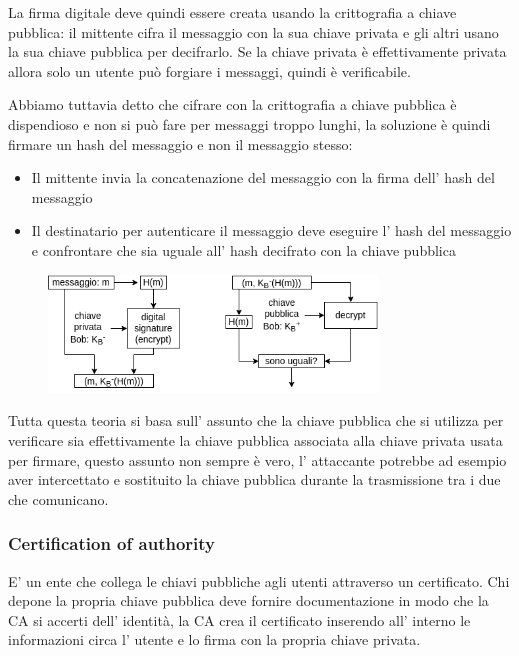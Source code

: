 La firma digitale deve quindi essere creata usando la crittografia a chiave pubblica: il mittente cifra il messaggio con la sua chiave privata e gli altri usano la sua chiave pubblica per decifrarlo.
Se la chiave privata è effettivamente privata allora solo un utente può forgiare i messaggi, quindi è verificabile.

Abbiamo tuttavia detto che cifrare con la crittografia a chiave pubblica è dispendioso e non si può fare per messaggi troppo lunghi, la soluzione è quindi firmare un hash del messaggio e non il messaggio stesso:
\begin{itemize}
    \item Il mittente invia la concatenazione del messaggio con la firma dell' hash del messaggio
    
    \item Il destinatario per autenticare il messaggio deve eseguire l' hash del messaggio e confrontare che sia uguale all' hash decifrato con la chiave pubblica
\end{itemize}

\begin{figure}[H]
    \centering
    \includegraphics[width=330px]{images/7_Security/signed_MAC.png}
\end{figure}

Tutta questa teoria si basa sull' assunto che la chiave pubblica che si utilizza per verificare sia effettivamente la chiave pubblica associata alla chiave privata usata per firmare, questo assunto non sempre è vero, l' attaccante potrebbe ad esempio aver intercettato e sostituito la chiave pubblica durante la trasmissione tra i due che comunicano.

\subsubsection{Certification of authority}
E' un ente che collega le chiavi pubbliche agli utenti attraverso un certificato.
Chi depone la propria chiave pubblica deve fornire documentazione in modo che la CA si accerti dell' identità, la CA crea il certificato inserendo all' interno le informazioni circa l' utente e lo firma con la propria chiave privata.

